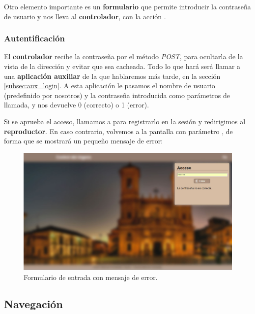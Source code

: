 Otro elemento importante es un \textbf{formulario} que permite introducir la contraseña de usuario y nos lleva al \textbf{controlador}, con la acción .

\subsubsection{Autentificación}

El \textbf{controlador} recibe la contraseña por el método \textit{POST}, para ocultarla de la vista de la dirección y evitar que sea cacheada. Todo lo que hará será llamar a una \textbf{aplicación auxiliar} de la que hablaremos más tarde, en la sección \ref{subsec:aux_login}. A esta aplicación le pasamos el nombre de usuario (predefinido por nosotros) y la contraseña introducida como parámetros de llamada, y nos devuelve 0 (correcto) o 1 (error).

Si se aprueba el acceso, llamamos a  para registrarlo en la sesión y redirigimos al \textbf{reproductor}. En caso contrario, volvemos a la pantalla con parámetro , de forma que se mostrará un pequeño mensaje de error:

\smallskip

\begin{figure}[H]
	\noindent \begin{centering}
		\includegraphics[width=\linewidth*3/4]{capitulo5/cap_login_error}
		\par\end{centering}
	\smallskip
	\caption{\label{fig:cap_login_error} Formulario de entrada con mensaje de error.}
\end{figure} 

\smallskip

\subsection{Navegación}

